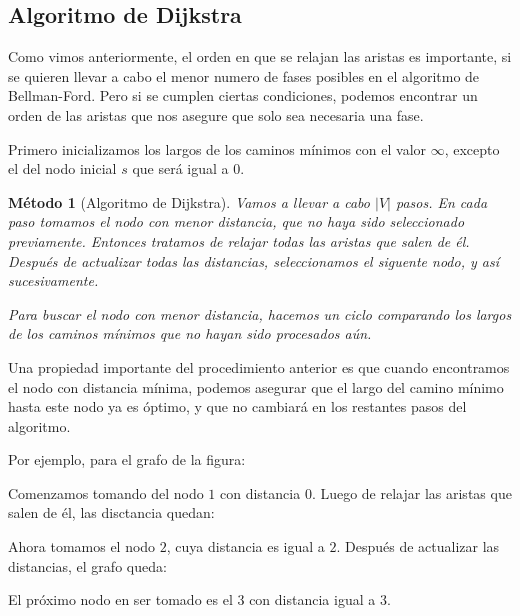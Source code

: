 \documentclass[a4paper, 10pt]{article}
\numberwithin{theoremCounter}{subsection}
\numberwithin{problemCounter}{subsection}
\numberwithin{defCounter}{subsection}
\numberwithin{obsCounter}{subsection}
\newcounter{methCounter}
\numberwithin{methCounter}{subsection}
\numberwithin{exampleCounter}{subsection}
\numberwithin{propCounter}{subsection}
\theoremstyle{violetnumbox}
\theoremstyle{blacknumex}
\newtheorem{corollaryT}[methCounter]{M\'etodo}
\newenvironment{corollary}{\begin{cBox}\begin{corollaryT}}{\end{corollaryT}\end{cBox}}
\begin{document}
\begin{multicols}{2}

    \section{Algoritmo de Dijkstra}
    Como vimos anteriormente, el orden en que se relajan las aristas es importante, si se quieren llevar a cabo el menor numero de fases posibles en el algoritmo de Bellman-Ford. Pero si se cumplen ciertas condiciones, podemos encontrar un orden de las aristas que nos asegure que solo sea necesaria una fase.

    Primero inicializamos los largos de los caminos m\'inimos con el valor $\infty$, excepto el del nodo inicial $s$ que ser\'a igual a $0$.
    
    \begin{corollary}[Algoritmo de Dijkstra]
        Vamos a llevar a cabo $|V|$ pasos. En cada paso tomamos el nodo con menor distancia, que no haya sido seleccionado previamente. Entonces tratamos de relajar todas las aristas que salen de \'el. Despu\'es de actualizar todas las distancias, seleccionamos el siguente nodo, y as\'i sucesivamente.

        Para buscar el nodo con menor distancia, hacemos un ciclo comparando los largos de los caminos m\'inimos que no hayan sido procesados a\'un.

    \end{corollary}

    Una propiedad importante del procedimiento anterior es que cuando encontramos el nodo con distancia m\'inima, podemos asegurar que el largo del camino m\'inimo hasta este nodo ya es \'optimo, y que no cambiar\'a en los restantes pasos del algoritmo.

    Por ejemplo, para el grafo de la figura:


    Comenzamos tomando del nodo $1$ con distancia $0$. Luego de relajar las aristas que salen de \'el, las disctancia quedan:


    Ahora tomamos el nodo $2$, cuya distancia es igual a $2$. Despu\'es de actualizar las distancias, el grafo queda:


    El pr\'oximo nodo en ser tomado es el $3$ con distancia igual a $3$.



\end{multicols}
\end{document}
